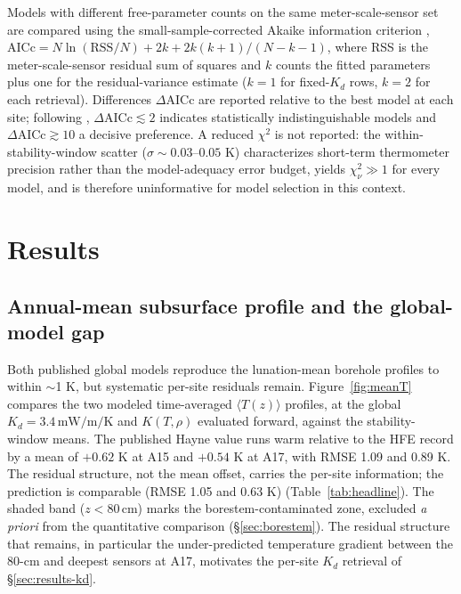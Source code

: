 \documentclass[11pt]{article}
\newcommand{\zborestem}{80\,\si{\centi\meter}}
\begin{document}
Models with different free-parameter counts on the same
meter-scale-sensor set are compared using the
small-sample-corrected Akaike information criterion \citep{burnham2002},
$\mathrm{AICc}=N\ln(\mathrm{RSS}/N)+2k+2k(k{+}1)/(N{-}k{-}1)$, where RSS is
the meter-scale-sensor residual sum of squares and
$k$ counts the fitted parameters plus one for the residual-variance
estimate ($k=1$ for fixed-$K_d$ rows, $k=2$ for each retrieval). Differences $\Delta\mathrm{AICc}$ are reported relative
to the best model at each site; following \citet{burnham2002},
$\Delta\mathrm{AICc}\lesssim 2$ indicates statistically indistinguishable
models and $\Delta\mathrm{AICc}\gtrsim 10$ a decisive preference. A reduced
$\chi^2$ is not reported: the within-stability-window scatter
($\sigma\sim 0.03$--$0.05$ K) characterizes short-term thermometer
precision rather than the model-adequacy error budget, yields
$\chi^2_\nu\gg 1$ for every model, and is therefore uninformative for model
selection in this context.

\section{Results}\label{sec:results}

\subsection{Annual-mean subsurface profile and the global-model gap}%
\label{sec:results-mean}
Both published global models
reproduce the lunation-mean borehole profiles to within $\sim$1 K, but
systematic per-site residuals remain. Figure~\ref{fig:meanT} compares
the two modeled time-averaged $\langle T(z)\rangle$ profiles,
\citet{hayne2017} at the global
$K_d=3.4\,\si{\milli\watt\per\meter\per\kelvin}$ and
\citet{martinez2021} $K(T,\rho)$ evaluated forward, against the
stability-window means. The published Hayne value runs warm relative to the
HFE record by a mean of $+0.62$ K at A15 and $+0.54$ K at A17, with RMSE 1.09 and
0.89 K. The residual structure, not the mean offset, carries the
per-site information; the \citet{martinez2021} prediction
is
comparable (RMSE 1.05 and 0.63 K) (Table~\ref{tab:headline}). The
shaded band ($z<\zborestem$) marks the borestem-contaminated zone,
excluded \emph{a priori} from the quantitative comparison
(\S\ref{sec:borestem}). The residual structure that remains, in particular the
under-predicted temperature gradient between the 80-cm and deepest
sensors at A17, motivates the per-site $K_d$ retrieval of
\S\ref{sec:results-kd}.
\end{document}

